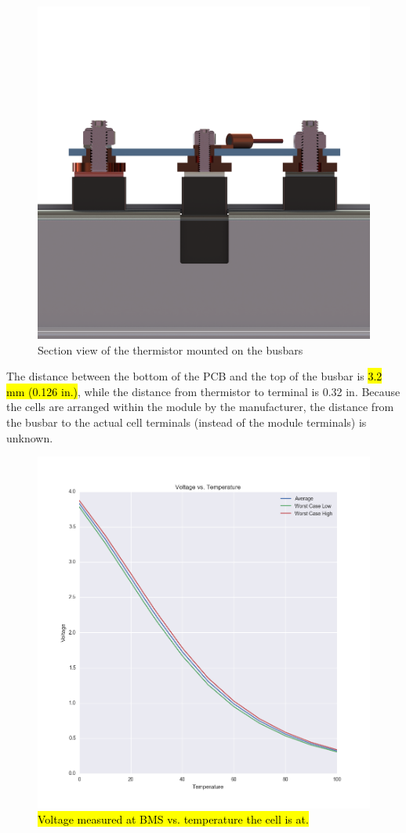 \documentclass{article}
\DeclareRobustCommand{\hlr}[1]{{\sethlcolor{red}\hl{#1}}}
\begin{document}
            \begin{figure}[H]
                \centering
                \includegraphics[width = 0.5 \textwidth]{busbarstack}
                \caption{Section view of the thermistor mounted on the busbars}
                \label{busbarstack}
            \end{figure}

            The distance between the bottom of the PCB and the top of the busbar is \hlr{3.2 mm (0.126 in.)}, while the distance from thermistor to terminal is 0.32 in. Because the cells are arranged within the module by the manufacturer, the distance from the busbar to the actual cell terminals (instead of the module terminals) is unknown.

            \begin{figure}[H]
            \centering
            \includegraphics[width =0.6 \textwidth]{VoltageVSTemp.png}
            \caption{\hlr{Voltage measured at BMS vs. temperature the cell is at.}}
            \label{fig:voltageCellvsTemp}
            \end{figure}
\end{document}

